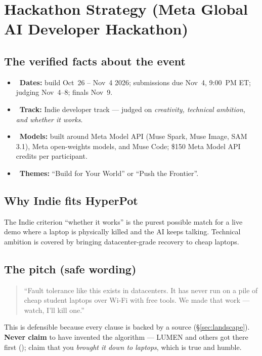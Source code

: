\section{Hackathon Strategy (Meta Global AI Developer Hackathon)}
\label{sec:hackathon}

\subsection{The verified facts about the event}
\begin{itemize}[leftmargin=1.4em,nosep]
  \item \VER\ \textbf{Dates:} build Oct~26 -- Nov~4 2026; submissions due Nov~4,
  9:00~PM ET; judging Nov~4--8; finals Nov~9.
  \item \VER\ \textbf{Track:} Indie developer track --- judged on
  \emph{creativity, technical ambition, and whether it works}.
  \item \VER\ \textbf{Models:} built around Meta Model API (Muse Spark, Muse
  Image, SAM 3.1), Meta open-weights models, and Muse Code; \$150 Meta Model API
  credits per participant.
  \item \VER\ \textbf{Themes:} ``Build for Your World'' or ``Push the Frontier''.
\end{itemize}

\subsection{Why Indie fits HyperPot}
The Indie criterion ``whether it works'' is the purest possible match for a live
demo where a laptop is physically killed and the AI keeps talking. Technical
ambition is covered by bringing datacenter-grade recovery to cheap laptops.

\subsection{The pitch (safe wording)}
\begin{quote}
``Fault tolerance like this exists in datacenters. It has never run on a pile of
cheap student laptops over Wi-Fi with free tools. We made that work --- watch,
I'll kill one.''
\end{quote}
This is defensible because every clause is backed by a source
(\S\ref{sec:landscape}). \textbf{Never claim} to have invented the algorithm ---
LUMEN and others got there first (\VER); claim that you \emph{brought it down to
laptops}, which is true and humble.

